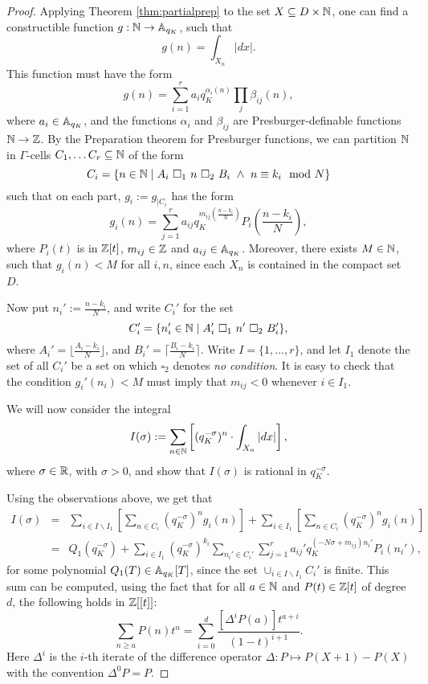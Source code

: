 \begin{proof}


Applying Theorem \ref{thm:partialprep} to the set $X \subseteq D\times \NN$, one can find a constructible function $g: \NN \to \AA_{q_K}$, such that
\[g(n) = \int_{X_n}|dx|.\]
This function must have the form 
\[g(n) = \sum_{i=1}^r a_iq_K^{\alpha_i(n)}\prod_j\beta_{ij}(n),\]
where $a_i \in \AA_{q_K}$, and the functions $\alpha_i$ and $\beta_{ij}$ are Presburger-definable functions $\NN \to \ZZ$. By the Preparation theorem for Presburger functions, we can partition $\N$ in $\Gamma$-cells $C_1, \ldots C_r \subseteq \N$ of the form
\[C_i = \{ n \in \N \mid A_i \ \square_1 \ n \ \square_2\ B_i \ \wedge\ n \equiv k_i \mod N \}\]
 such that on each part, $g_i:= g_{|C_i}$ has the form 
\[g_i(n) = \sum_{j=1}^r a_{ij}q_K^{m_{ij}(\frac{n-k_i}{N})}P_i\left(\frac{n-k_i}{N}\right),\]
where $P_i(t)$ is in $\Z[t]$, $m_{ij} \in \ZZ$ and $a_{ij} \in \AA_{q_K}$. Moreover, there exists $M \in \N$, such that $g_i(n) <M$ for all $i,n$, since each $X_n$ is contained in the compact set $D$.
 
Now put $n_i' := \frac{n-k_i}{N}$, and write $C_i'$ for the set
\[C_i'=\{n_i'\in \N \mid A_i'\ \square_1 \ n' \ \square_2 \ B_i'\},\]
where $A_i' =\lfloor \frac{A_i-k_i}{N}\rfloor$, and $B_i' =\lceil \frac{B_i-k_i}{N}\rceil$. Write $I = \{1, \ldots, r\}$, and let $I_1$ denote the set of all $C_i'$ be a set on which $\square_2$ denotes \emph{no condition}. It is easy to check that the condition $g_i'(n_i) <M$ must imply that $m_{ij}<0$ whenever $i \in I_1$.  

We will now consider the integral
\[I(\sigma):=\sum_{n\in\NN}\left[(q_K^{-\sigma})^{n}\cdot \int_{X_n}|dx|\right],\] 
where $\sigma \in \RR$, with $\sigma>0$, and show that $I(\sigma)$ is rational in $q_K^{-\sigma}$.

Using the observations above, we get that
\begin{eqnarray*}
I(\sigma) %
&=& \sum_{i\in I\backslash I_1}\left[ \sum_{n \in C_i} (q_K^{-\sigma})^{n}g_i(n)\right] + \sum_{i\in I_1}\left[ \sum_{n \in C_i} (q_K^{-\sigma})^{n}g_i(n)\right]\\
&=&Q_1(q_K^{-\sigma}) +\sum_{i \in I_1 }(q_K^{-\sigma})^{k_i} \sum_{n_i' \in C_i'}\sum_{j=1}^r a_{ij}'q_K^{(-N\sigma +m_{ij})n_i'}P_i(n_i'),
\end{eqnarray*}
for some polynomial $Q_1(T) \in \AA_{q_K}[T]$, since the set $\cup_{i\in I\backslash I_1} C_i'$ is finite.
This sum can be computed, using the fact that for all $a \in \N$ and $P(t) \in \Z[t]$ of degree $d$, the following holds in $\Z[[t]]$:
\[\sum_{n \geqslant a} P(n)t^n =\sum_{i=0}^d	\frac{[\Delta^iP(a)]t^{a+i}}{(1 - t )^{i+1}}.\]
Here $\Delta^i$ is the $i$-th iterate of the difference operator $\Delta:P \mapsto P(X + 1) - P(X)$ with the convention $\Delta^0P = P$.


\end{proof}
